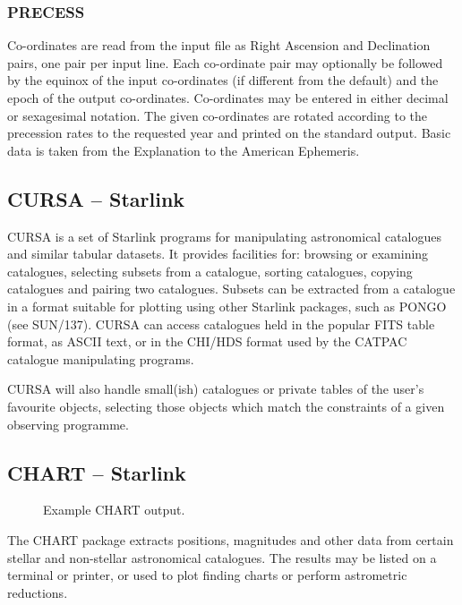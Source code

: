 \documentclass[twoside,11pt]{article}
\newcommand{\htmladdnormallink}[2]{#1}
\newcommand{\xref}[3]{#1}
\newcommand{\xlabel}[1]{}
\newcommand{\STARLINKref}{\htmladdnormallink{Starlink}{http://www.starlink.ac.uk/}}
\newcommand{\CATPACref}{\xref{CATPAC}{sun120}{}}
\newcommand{\CURSAref}{\xref{CURSA}{sun190}{}}
\newcommand{\PONGOref}{\xref{PONGO}{sun137}{}}
\newcommand{\PONGSUNref}{\xref{SUN/137}{sun137}{}}
\newcommand{\CHARTref}{\xref{CHART}{sun32}{}}
\begin{document}
\subsubsection{PRECESS}

Co-ordinates are read from the input file as Right Ascension and Declination pairs, one pair per
input line.  Each co-ordinate pair may optionally be followed by the equinox
of the input co-ordinates (if different from the default) and the epoch of the
output co-ordinates.  Co-ordinates may be entered in either decimal or
sexagesimal notation.  The given co-ordinates are rotated according to the
precession rates to the requested year and printed on the standard output.
Basic data is taken from the Explanation to the American Ephemeris.


\subsection{{\CURSAref} -- {\STARLINKref}} \xlabel{CURSA}
\label{sec:cursa}


{\CURSAref} is a set of {\STARLINKref} programs for manipulating astronomical
catalogues and similar tabular datasets. It provides facilities for: browsing
or examining catalogues, selecting subsets from a catalogue, sorting
catalogues, copying catalogues and pairing two catalogues. Subsets can be
extracted from a catalogue in a format suitable for plotting using other
Starlink packages, such as {\PONGOref} (see {\PONGSUNref)}. CURSA can access
catalogues held in the popular FITS table format, as ASCII text, or in the
CHI/HDS format used by the {\CATPACref} catalogue manipulating programs.

CURSA will also handle small(ish) catalogues or private tables of the user's
favourite objects, selecting those objects which match the constraints of a given
observing programme.

\subsection{{\CHARTref} -- {\STARLINKref}} \xlabel{CHART}
\label{sec:chart}

\begin{figure}[htbp]
\leavevmode
\centering {}
\vspace{5mm}
\caption{Example CHART output.}
\label{fig_chart}
\xlabel{fig_chart}
\end{figure}

The {\CHARTref} package extracts positions, magnitudes and other data from certain
stellar and non-stellar astronomical catalogues. The results may be listed on
a terminal or printer, or used to plot finding charts or perform astrometric
reductions.
\end{document}
